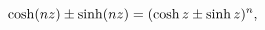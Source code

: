 \[\mathop{\cosh\/}\nolimits\!\left(nz\right)\pm\mathop{\sinh\/}\nolimits\!\left(%
nz\right)=(\mathop{\cosh\/}\nolimits z\pm\mathop{\sinh\/}\nolimits z)^{n},\]